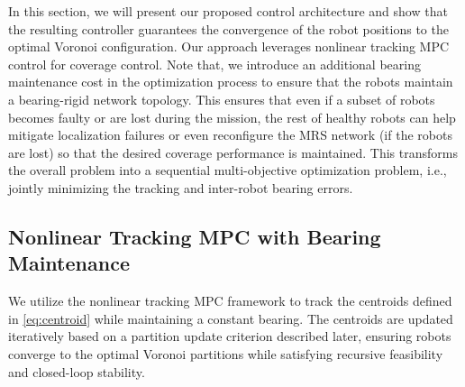 In this section, we will present our proposed control architecture and show that the resulting controller guarantees the convergence of the robot positions to the optimal Voronoi configuration. Our approach leverages nonlinear tracking MPC control for coverage control. Note that, we introduce an additional bearing maintenance cost in the optimization process to ensure that the robots maintain a bearing-rigid network topology. This ensures that even if a subset of robots becomes faulty or are lost during the mission, the rest of healthy robots can help mitigate localization failures or even reconfigure the MRS network (if the robots are lost) so that the desired coverage performance is maintained. This transforms the overall problem into a sequential multi-objective optimization problem, i.e., jointly minimizing the tracking and inter-robot bearing errors. 
\subsection{Nonlinear Tracking MPC with Bearing Maintenance}
We utilize the nonlinear tracking MPC framework to track the centroids defined in \eqref{eq:centroid} while maintaining a constant bearing. The centroids are updated iteratively based on a partition update criterion described later, ensuring robots converge to the optimal Voronoi partitions while satisfying recursive feasibility and closed-loop stability. 

